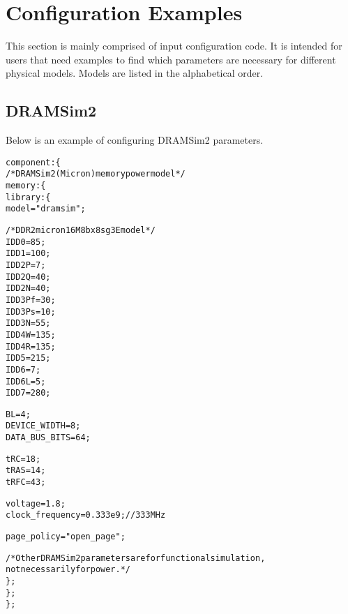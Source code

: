 \appendix
\section{Configuration Examples} \label{app:sec:configuration}
\noindent
This section is mainly comprised of input configuration code. 
It is intended for users that need examples to find which parameters are necessary for different physical models. 
Models are listed in the alphabetical order.

\subsection{DRAMSim2}
\noindent
Below is an example of configuring DRAMSim2 parameters.
{
\fontsize{10pt}{11pt}\selectfont
\begin{alltt}
component: \{
    /* DRAMSim2 (Micron) memory power model */
    memory: \{
        library: \{
            model = "dramsim";
            
            /* DDR2 micron 16M 8b x 8 sg3E model */
            IDD0 = 85;
            IDD1 = 100;
            IDD2P = 7;
            IDD2Q = 40;
            IDD2N = 40;
            IDD3Pf = 30;
            IDD3Ps = 10;
            IDD3N = 55;
            IDD4W = 135;
            IDD4R = 135;
            IDD5 = 215;
            IDD6 = 7;
            IDD6L = 5;
            IDD7 = 280;
            
            BL = 4;
            DEVICE_WIDTH = 8;
            DATA_BUS_BITS = 64;
            
            tRC = 18;
            tRAS = 14;
            tRFC = 43;
            
            voltage = 1.8;
            clock_frequency = 0.333e9; // 333MHz
            
            page_policy = "open_page";
            
            /* Other DRAMSim2 parameters are for functional simulation, 
            not necessarily for power. */
        \};
    \};
\};
\end{alltt}
}

\pagebreak
